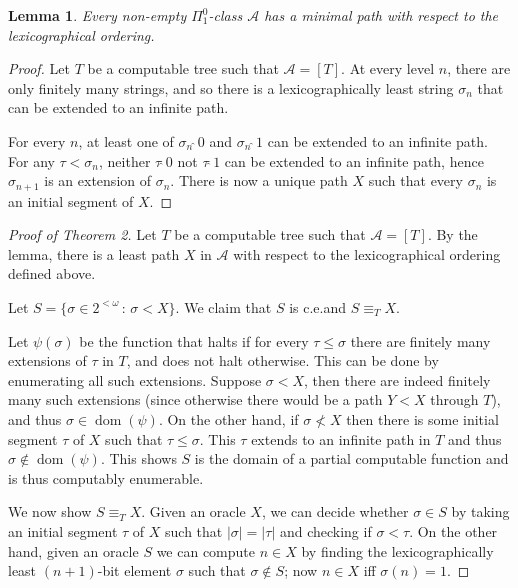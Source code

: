 \documentclass{article}
\newtheorem{lemma}[theorem]{Lemma}
\newcommand{\compr}[2]{\{ #1 \,:\, #2 \}}
\newcommand{\PiOne}{\Pi^0_1}
\newcommand{\Cons}{\widehat{\,\,}}
\DeclareMathOperator{\dom}{dom}
\begin{document}
  \begin{lemma}
    Every non-empty $\PiOne$-class $\mathcal{A}$ has a minimal path with respect to the lexicographical ordering.
  \end{lemma}

  \begin{proof}
    Let $T$ be a computable tree such that $\mathcal{A} = [T]$.  At every level $n$, there are only finitely many
    strings, and so there is a lexicographically least string $\sigma_n$ that can be extended to an infinite path.

    For every $n$, at least one of $\sigma_n \Cons 0$ and $\sigma_n \Cons 1$ can be extended to an infinite path.  For
    any $\tau < \sigma_n$, neither $\tau \Cons 0$ not $\tau \Cons 1$ can be extended to an infinite path, hence
    $\sigma_{n+1}$ is an extension of $\sigma_n$.  There is now a unique path $X$ such that every $\sigma_n$ is an
    initial segment of $X$.
  \end{proof}

  \begin{proof}[Proof of Theorem 2]
    Let $T$ be a computable tree such that $\mathcal{A} = [T]$.  By the lemma, there is a least path $X$ in
    $\mathcal{A}$ with respect to the lexicographical ordering defined above.

    Let $S = \compr{\sigma \in 2^{<\omega}}{\sigma < X}$.  We claim that $S$ is c.e.\@ and $S \equiv_T X$.

    Let $\psi(\sigma)$ be the function that halts if for every $\tau \le \sigma$ there are finitely many extensions of
    $\tau$ in $T$, and does not halt otherwise.  This can be done by enumerating all such extensions.  Suppose $\sigma <
    X$, then there are indeed finitely many such extensions (since otherwise there would be a path $Y < X$ through $T$),
    and thus $\sigma \in \dom(\psi)$.  On the other hand, if $\sigma \not < X$ then there is some initial segment $\tau$
    of $X$ such that $\tau \le \sigma$.  This $\tau$ extends to an infinite path in $T$ and thus $\sigma \not \in
    \dom(\psi)$.  This shows $S$ is the domain of a partial computable function and is thus computably enumerable.

    We now show $S \equiv_T X$.  Given an oracle $X$, we can decide whether $\sigma \in S$ by taking an initial
    segment $\tau$ of $X$ such that $|\sigma| = |\tau|$ and checking if $\sigma < \tau$.  On the other hand, given an
    oracle $S$ we can compute $n \in X$ by finding the lexicographically least $(n+1)$-bit element $\sigma$ such that
    $\sigma \not \in S$; now $n \in X$ iff $\sigma(n) = 1$.
  \end{proof}
\end{document}
